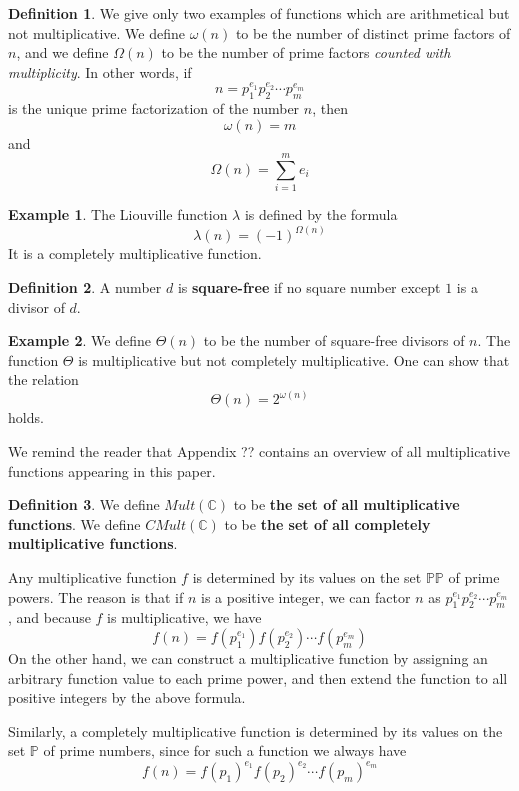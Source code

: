 \documentclass[a4paper]{article}
\theoremstyle{definition}
\newtheorem{definition}{Definition}[section]
\newtheorem{example}{Example}[section]
\theoremstyle{remark}
\newcommand{\bbP}{\mathbb{P}}
\newcommand{\PP}{\mathbb{PP}}
\newcommand{\defhl}[1]{\textbf{#1}}
\begin{document}
\begin{definition}
We give only two examples of functions which are arithmetical but not multiplicative. We define $\omega(n)$ to be the number of distinct prime factors of $n$, and we define $\Omega(n)$ to be the number of prime factors \emph{counted with multiplicity}. In other words, if
$$ n = p_1 ^{e_1} p_2^{e_2} \cdots p_m^{e_m}  $$
is the unique prime factorization of the number $n$, then
$$ \omega(n) = m    $$
and
$$  \Omega(n) = \sum_{i=1}^m  e_i $$
\end{definition}

\begin{example}
The Liouville function $\lambda$ is defined by the formula
$$ \lambda(n) = (-1)^{\Omega(n)}  $$
It is a completely multiplicative function.
\end{example}

\begin{definition}
A number $d$ is \defhl{square-free} if no square number except $1$ is a divisor of $d$.
\end{definition}

\begin{example}
We define $\Theta(n)$ to be the number of square-free divisors of $n$. The function $\Theta$ is multiplicative but not completely multiplicative. One can show that the relation
$$ \Theta(n) = 2^{\omega(n)}   $$
holds.
\end{example}

We remind the reader that Appendix ?? contains an overview of all multiplicative functions appearing in this paper.

\begin{definition}
We define $Mult(\mathbb{C})$ to be \defhl{the set of all multiplicative functions}. We define $CMult(\mathbb{C})$ to be \defhl{the set of all completely multiplicative functions}.
\end{definition}


Any multiplicative function $f$ is determined by its values on the set $\PP$ of prime powers. The reason is that if $n$ is a positive integer, we can factor $n$ as $p_1^{e_1} p_2^{e_2} \cdots p_m^{e_m}$, and because $f$ is multiplicative, we have
$$ f(n) = f(p_1^{e_1}) f( p_2^{e_2}) \cdots f(p_m^{e_m})   $$
On the other hand, we can construct a multiplicative function by assigning an arbitrary function value to each prime power, and then extend the function to all positive integers by the above formula. 

Similarly, a completely multiplicative function is determined by its values on the set $\bbP$ of prime numbers, since for such a function we always have
$$  f(n) = f(p_1)^{e_1} f( p_2)^{e_2} \cdots f(p_m)^{e_m}  $$
\end{document}

